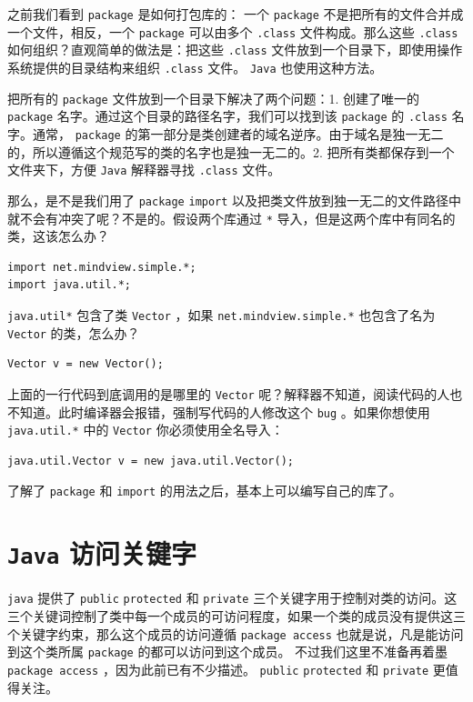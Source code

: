 \documentclass[10pt,a4paper,UTF8]{article}
\begin{document}
之前我们看到 \texttt{package} 是如何打包库的： 一个 \texttt{package} 不是把所有的文件合并成一个文件，相反，一个 \texttt{package} 可以由多个 \texttt{.class} 文件构成。那么这些 \texttt{.class} 如何组织？直观简单的做法是：把这些 \texttt{.class} 文件放到一个目录下，即使用操作系统提供的目录结构来组织 \texttt{.class} 文件。 \texttt{Java} 也使用这种方法。

把所有的 \texttt{package} 文件放到一个目录下解决了两个问题：1. 创建了唯一的 \texttt{package} 名字。通过这个目录的路径名字，我们可以找到该 \texttt{package} 的 \texttt{.class} 名字。通常， \texttt{package} 的第一部分是类创建者的域名逆序。由于域名是独一无二的，所以遵循这个规范写的类的名字也是独一无二的。2. 把所有类都保存到一个文件夹下，方便 \texttt{Java} 解释器寻找 \texttt{.class} 文件。


那么，是不是我们用了 \texttt{package} \texttt{import} 以及把类文件放到独一无二的文件路径中就不会有冲突了呢？不是的。假设两个库通过 \texttt{*} 导入，但是这两个库中有同名的类，这该怎么办？
\begin{verbatim}
import net.mindview.simple.*;
import java.util.*;
\end{verbatim}

\texttt{java.util*} 包含了类 \texttt{Vector} ，如果 \texttt{net.mindview.simple.*} 也包含了名为 \texttt{Vector} 的类，怎么办？
\begin{verbatim}
Vector v = new Vector();
\end{verbatim}

上面的一行代码到底调用的是哪里的 \texttt{Vector} 呢？解释器不知道，阅读代码的人也不知道。此时编译器会报错，强制写代码的人修改这个 \texttt{bug} 。如果你想使用 \texttt{java.util.*} 中的 \texttt{Vector} 你必须使用全名导入：
\begin{verbatim}
java.util.Vector v = new java.util.Vector();
\end{verbatim}

了解了 \texttt{package} 和 \texttt{import} 的用法之后，基本上可以编写自己的库了。


\section{\texttt{Java} 访问关键字}
\label{sec:orga9e6f27}


\texttt{java} 提供了 \texttt{public} \texttt{protected} 和 \texttt{private} 三个关键字用于控制对类的访问。这三个关键词控制了类中每一个成员的可访问程度，如果一个类的成员没有提供这三个关键字约束，那么这个成员的访问遵循 \texttt{package access} 也就是说，凡是能访问到这个类所属 \texttt{package} 的都可以访问到这个成员。 不过我们这里不准备再着墨 \texttt{package access} ，因为此前已有不少描述。 \texttt{public} \texttt{protected} 和 \texttt{private} 更值得关注。
\end{document}
